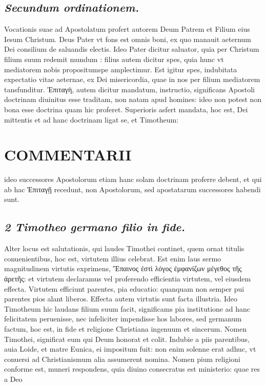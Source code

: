 \documentclass{article}
\begin{document}
\begin{pages}
\subsection*{\textit{Secundum ordinationem. }}\pstart Vocationis suae ad Apostolatum profert autorem Deum Patrem et Filium eius Iesum Christum. Deus Pater vt fons est omnis boni, ex quo manauit aeternum Dei consilium de saluandis electis. Ideo Pater dicitur saluator, quia per Christum filium suum redemit mundum : filius autem dicitur spes, quia hunc vt mediatorem nobis propositumspe amplectimur. Est igitur spes, indubitata expectatio vitae aeternae, ex Dei misericordia, quae in nos per filium mediatorem tansfunditur.  \pend\pstart Ἐπιταγὴ, autem dicitur mandatum, instructio, significans Apostoli doctrinam diuinitus esse traditam, non natam apud homines: ideo non potest non bona esse doctrina quam hic proferet. Superioris asfert mandata, hoc est, Dei mittentis et ad hanc doctrinam ligat se, et Timotheum:  \pend
\section*{COMMENTARII }
\marginpar{[ p.12 ]}\pstart ideo successores Apostolorum etiam hanc solam doctrinam proferre debent, et qui ab hac Ἐπιταγῇ  recedunt, non Apostolorum, sed apostatarum successores habendi sunt.  \pend
{}
{}
\subsection*{\textit{2 Timotheo germano filio in fide. }}\pstart Alter locus est salutationis, qui laudes Timothei continet, quem ornat titulis conuenientibus, hoc est, virtutem illius celebrat. Est enim laus sermo magnitudinem virtutis exprimens, Ἔπαινος ἐστὶ λόγος ἐμφανίζων μέγεθος τῆς ἀρετῆς: et virtutem declaramus vel proferendo efficientia virtutem, vel eiusdem effecta. Virtutem efficiunt parentes, pia educatio: quanquam non semper pui parentes pios alant liberos. Effecta autem virtutis sunt facta illustria. Ideo Timotheum hic laudans filium suum facit, significams pia institutione ad hanc felicitatem peruenisse, nec infeliciter impendisse hos labores, sed germanum factum, hoc est, in fide et religione Christiana ingenuum et sincerum.  \pend\pstart Nomen Timothei, significat eum qui Deum honorat et colit. Indubie a piis parentibus, auia Loide, et matre Eunica, ei impositum fuit: non enim solenne erat adhuc, vt conuersi ad Christianismum alia assumerent nomina. Nomen pium religioni conforme est, muneri respondens, quia diuino consecratus est ministerio: quae res a Deo  \pend

\end{pages}
\end{document}
